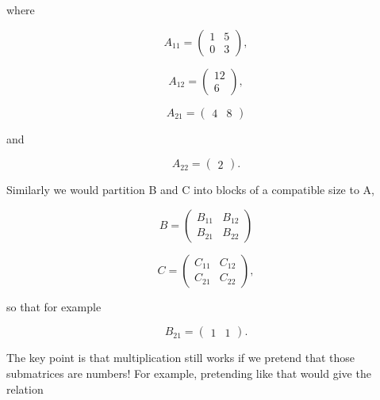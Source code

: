 where

\begin{equation}
A_{11} =
\left (
\begin{array}{cc}
1 & 5 \\
0 & 3
\end{array}
\right )  ,
\end{equation}

\begin{equation}
A_{12} =
\left (
\begin{array}{cc}
12 \\
6 
\end{array}
\right ),
\end{equation}

\begin{equation}
A_{21} =
\left (
\begin{array}{cc}
4 & 8 
\end{array}
\right )  
\end{equation}

and

\begin{equation}
A_{22} =
\left (
\begin{array}{c}
2
\end{array}
\right ).
\end{equation}

Similarly we would partition B and C into blocks of a compatible size to A,

\begin{equation}
B =
\left (
\begin{array}{cc}
B_{11} & B_{12} \\
B_{21} & B_{22}
\end{array}
\right )
\end{equation}

\begin{equation}
C =
\left (
\begin{array}{cc}
C_{11} & C_{12} \\
C_{21} & C_{22}
\end{array}
\right ) ,
\end{equation}

so that for example

\begin{equation}
B_{21} =
\left (
\begin{array}{cc}
1 & 1
\end{array}
\right ) .
\end{equation}

The key point is that multiplication still works if we pretend that
those submatrices are numbers!  For example, pretending like that would
give the relation

